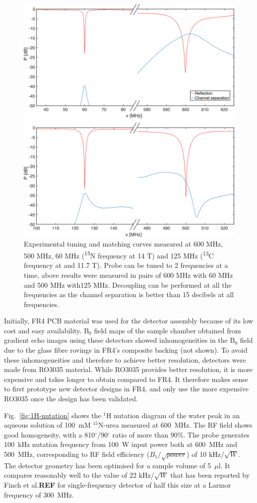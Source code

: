 \documentclass[preprint,12pt]{article}
\newcommand{\todo}[1]{{\color{red}\textbf{#1}}}
\newcommand{\fig}[1]{Fig.~\ref{#1}}
\begin{document}
\begin{figure}
\centering
\includegraphics[width=.7\linewidth,keepaspectratio=true]{./figures/ms5n17-tlp-im-180710-tandm-sameaxis.png} 
\caption{
Experimental tuning and matching curves measured at 600 MHz, 500 MHz, 
60 MHz (\textsuperscript{15}N frequency at 14 T) and 125 MHz (\textsuperscript{13}C frequency at  and 11.7 T). 
Probe can be tuned to 2 frequencies at a time, above results were measured in 
pairs of 600 MHz with 60 MHz and 500 MHz with125 MHz. Decoupling can be performed at all the 
frequencies as the channel separation is better than 15 decibels at all frequencies.}
\label{fig:tandm} 
\end{figure}

Initially, FR4 PCB material was used for the detector assembly because of its low cost and easy availability. 
B$_0$ field maps of the sample chamber obtained from gradient echo images using these detectors 
showed inhomogeneities in the B$_0$ field due to the glass fibre rovings in FR4's composite backing (not shown).
To avoid these inhomogeneities and therefore to achieve better resolution, 
detectors were made from RO3035 material. While RO3035 provides better resolution, it is more expensive 
and takes longer to obtain compared to FR4. 
It therefore makes sense to first prototype new detector designs in FR4, and only use the more expensive RO3035 
once the design has been validated.

\fig{fig:1H-nutation} shows the $^1$H nutation diagram of the water peak in an aqueous solution of 
100~mM $^{15}$N-urea  measured at 600~MHz. The RF field shows good homogeneity, with a 810$^{\circ}$/90$^{\circ}$ 
ratio of more than 90\%. The probe generates 100~kHz nutation frequency from 100~W input power both at 
600~MHz and 500~MHz, corresponding to RF field efficiency ($B_{1}/\sqrt{power}$) of 10 kHz/$\sqrt{W}$. 
The detector geometry has been optimised for a sample volume of 5~$\mu$l. It compares reasonably well to
the value of 22 kHz/$\sqrt{W}$ that has been reported by Finch et al.\todo{REF} for single-frequency detector 
of half this size at a Larmor frequency of 300~MHz. 
\end{document}
